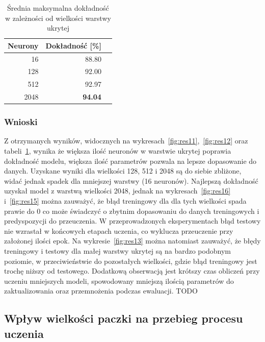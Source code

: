 \documentclass{article}
\begin{document}
\begin{table}[H]
	\caption{Średnia maksymalna dokładność w zależności od wielkości warstwy ukrytej}
	\label{tabela-res-11}
	\centering
	\begin{tabular}{rrr}
		\toprule
		Neurony & Dokładność [\%] \\
		\midrule
		16      & 88.80              \\
		128     & 92.00              \\
		512     & 92.97              \\
		2048    & \textbf{94.04}     \\
		\bottomrule
	\end{tabular}
\end{table}

\subsubsection*{Wnioski}

Z otrzymanych wyników, widocznych na wykresach~\ref{fig:res11},~\ref{fig:res12} oraz tabeli~\ref{tabela-res-11}, wynika że większa ilość neuronów w warstwie ukrytej poprawia dokładność modelu, większa ilość parametrów pozwala na lepsze dopasowanie do danych. Uzyskane wyniki dla wielkości 128, 512 i 2048 są do siebie zbliżone, widać jednak spadek dla mniejszej warstwy (16 neuronów). Najlepszą dokładność uzyskał model z warstwą wielkości 2048, jednak na wykresach~\ref{fig:res16} i~\ref{fig:res15} można zauważyć, że błąd treningowy dla dla tych wielkości spada prawie do 0 co może świadczyć o zbytnim dopasowaniu do danych treningowych i predyspozycji do przeuczenia. W przeprowadzonych eksperymentach błąd testowy nie wzrastał w końcowych etapach uczenia, co wyklucza przeuczenie przy założonej ilości epok. Na wykresie~\ref{fig:res13} można natomiast zauważyć, że błędy treningowy i testowy dla małej warstwy ukrytej są na bardzo podobnym poziomie, w przeciwieństwie do pozostałych wielkości, gdzie błąd treningowy jest trochę niższy od testowego. Dodatkową obserwacją jest krótszy czas obliczeń przy uczeniu mniejszych modeli, spowodowany mniejszą ilością parametrów do zaktualizowania oraz przemnożenia podczas ewaluacji.
TODO

\newpage
\subsection{Wpływ wielkości paczki na przebieg procesu uczenia}
\end{document}
